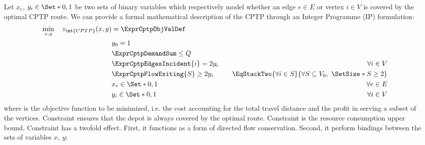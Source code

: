 Let $x_{e}$, $y_{i} \in \Set*{0, 1}$ be two sets of binary variables which respectively
model whether an edge $e \in E$ or vertex $i \in V$ is covered by the optimal CPTP route.
We can provide a formal mathematical description of the CPTP through an Integer Programme (IP) formulation:
\begin{align}
	\min_{x,y} \quad z_\mt{CPTP}(x, y) & = \ExprCptpObjValDef \label{eq:cptp-obj-function}                                                                                                                     \\
	                                   & y_0 = 1                                           & \label{eq:cptp-depot-part-of-tour-constraint}                                                                     \\
	                                   & \ExprCptpDemandSum  \le Q                         & \label{eq:cptp-resource-upper-bound-constraint}                                                                   \\
	                                   & \ExprCptpEdgesIncident{i}  = 2 y_i                & \quad \forall i \in V         \label{eq:cptp-flow-conservation-constraint}                                        \\
	                                   & \ExprCptpFlowExiting{S} \ge 2 y_{i}               & \quad \EqStackTwo{\forall i \in S}{\forall S \subseteq V_0,\ \SetSize*{S} \ge 2} \label{eq:cptp-gsec-constraints} \\
	                                   & x_{e}                   \in \Set*{0, 1}           & \quad \forall e \in E               \label{eq:cptp-x-mip-var-bounds}                                              \\
	                                   & y_{i}                    \in \Set*{0, 1}          & \quad \forall i \in V             \label{eq:cptp-y-mip-var-bounds}
\end{align}
where  is the objective function to be minimized, i.e. the cost
accounting for the total travel distance and the profit in serving a subset of the vertices.
Constraint  ensures that the depot is always covered by the optimal route.
Constraint  is the resource consumption upper bound.
Constraint  has a twofold effect.
First, it functions as a form of directed flow conservation.
Second, it perform bindings between the sets of variables $x,\ y$;
